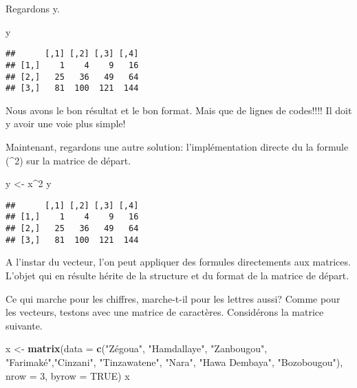 \documentclass[]{book}
\newenvironment{Shaded}{\begin{snugshade}}{\end{snugshade}}
\newcommand{\KeywordTok}[1]{\textcolor[rgb]{0.13,0.29,0.53}{\textbf{#1}}}
\newcommand{\DataTypeTok}[1]{\textcolor[rgb]{0.13,0.29,0.53}{#1}}
\newcommand{\DecValTok}[1]{\textcolor[rgb]{0.00,0.00,0.81}{#1}}
\newcommand{\StringTok}[1]{\textcolor[rgb]{0.31,0.60,0.02}{#1}}
\newcommand{\OtherTok}[1]{\textcolor[rgb]{0.56,0.35,0.01}{#1}}
\newcommand{\OperatorTok}[1]{\textcolor[rgb]{0.81,0.36,0.00}{\textbf{#1}}}
\newcommand{\NormalTok}[1]{#1}
\begin{document}
Regardons y.

\begin{Shaded}
\begin{Highlighting}[]
\NormalTok{y}
\end{Highlighting}
\end{Shaded}

\begin{verbatim}
##      [,1] [,2] [,3] [,4]
## [1,]    1    4    9   16
## [2,]   25   36   49   64
## [3,]   81  100  121  144
\end{verbatim}

Nous avons le bon résultat et le bon format. Mais que de lignes de
codes!!!! Il doit y avoir une voie plus simple!

Maintenant, regardons une autre solution: l'implémentation directe du la
formule (\^{}2) sur la matrice de départ.

\begin{Shaded}
\begin{Highlighting}[]
\NormalTok{y <-}\StringTok{ }\NormalTok{x}\OperatorTok{^}\DecValTok{2}
\NormalTok{y}
\end{Highlighting}
\end{Shaded}

\begin{verbatim}
##      [,1] [,2] [,3] [,4]
## [1,]    1    4    9   16
## [2,]   25   36   49   64
## [3,]   81  100  121  144
\end{verbatim}

A l'instar du vecteur, l'on peut appliquer des formules directements aux
matrices. L'objet qui en résulte hérite de la structure et du format de
la matrice de départ.

Ce qui marche pour les chiffres, marche-t-il pour les lettres aussi?
Comme pour les vecteurs, testons avec une matrice de caractères.
Considérons la matrice suivante.

\begin{Shaded}
\begin{Highlighting}[]
\NormalTok{x <-}\StringTok{ }\KeywordTok{matrix}\NormalTok{(}\DataTypeTok{data =} \KeywordTok{c}\NormalTok{(}\StringTok{"Zégoua"}\NormalTok{, }\StringTok{"Hamdallaye"}\NormalTok{, }\StringTok{"Zanbougou"}\NormalTok{,}
                     \StringTok{"Farimaké"}\NormalTok{,}\StringTok{"Cinzani"}\NormalTok{, }\StringTok{"Tinzawatene"}\NormalTok{,}
                     \StringTok{"Nara"}\NormalTok{, }\StringTok{"Hawa Dembaya"}\NormalTok{, }\StringTok{"Bozobougou"}\NormalTok{), }
            \DataTypeTok{nrow =} \DecValTok{3}\NormalTok{, }\DataTypeTok{byrow =} \OtherTok{TRUE}\NormalTok{)}
\NormalTok{x}
\end{Highlighting}
\end{Shaded}
\end{document}
